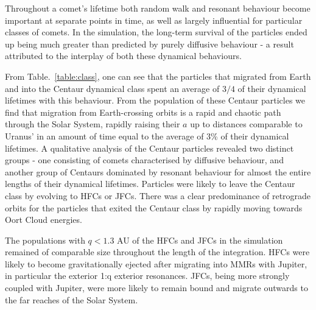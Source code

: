 Throughout a comet's lifetime both random walk and resonant behaviour become important at separate points in time, as well as largely influential for particular classes of comets. In the simulation, the long-term survival of the particles ended up being much greater than predicted by purely diffusive behaviour - a result attributed to the interplay of both these dynamical behaviours.

From Table.~\ref{table:class}, one can see that the particles that migrated from Earth and into the Centaur dynamical class spent an average of $3/4$ of their dynamical lifetimes with this behaviour. From the population of these Centaur particles we find that migration from Earth-crossing orbits is a rapid and chaotic path through the Solar System, rapidly raising their $a$ up to distances comparable to Uranus' in an amount of time equal to the average of 3\% of their dynamical lifetimes. A qualitative analysis of the Centaur particles revealed two distinct groups - one consisting of comets characterised by diffusive behaviour, and  another group of Centaurs dominated by resonant behaviour for almost the entire lengths of their dynamical lifetimes. Particles were likely to leave the Centaur class by evolving to HFCs or JFCs. There was a clear predominance of retrograde orbits for the particles that exited the Centaur class by rapidly moving towards Oort Cloud energies.

The populations with $q < 1.3$ AU of the HFCs and JFCs in the simulation remained of comparable size throughout the length of the integration. HFCs were likely to become gravitationally ejected after migrating into MMRs with Jupiter, in particular the exterior 1:q exterior resonances. JFCs, being more strongly coupled with Jupiter, were more likely to remain bound and migrate outwards to the far reaches of the Solar System.

